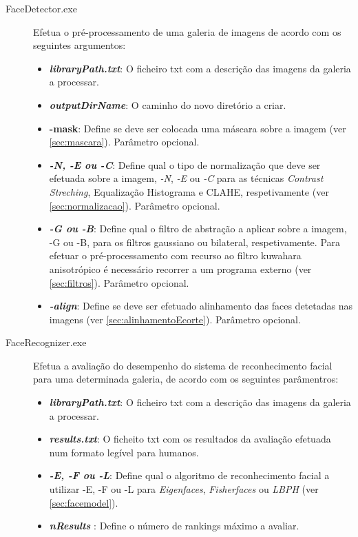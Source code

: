 \begin{description}
\item[FaceDetector.exe] Efetua o pré-processamento de uma galeria de imagens de acordo com os seguintes argumentos:

\begin{itemize}
\item \textbf{\textit{libraryPath.txt}}: O ficheiro txt com a descrição das imagens da galeria a processar.
\item \textbf{\textit{outputDirName}}: O caminho do novo diretório a criar.
\item \textbf{-mask}: Define se deve ser colocada uma máscara sobre a imagem (ver \ref{sec:mascara}). Parâmetro opcional.
\item \textbf{\textit{-N, -E ou -C}}: Define qual o tipo de normalização que deve ser efetuada sobre a imagem, \textit{-N}, \textit{-E} ou \textit{-C} para as técnicas \textit{Contrast Streching}, Equalização Histograma e CLAHE, respetivamente (ver \ref{sec:normalizacao}). Parâmetro opcional.
\item \textbf{\textit{-G ou -B}}: Define qual o filtro de abstração a aplicar sobre a imagem, -G ou -B, para os filtros gaussiano ou bilateral, respetivamente. Para efetuar o pré-processamento com recurso ao filtro kuwahara anisotrópico é necessário recorrer a um programa externo (ver \ref{sec:filtros}). Parâmetro opcional.
\item \textbf{\textit{-align}}: Define se deve ser efetuado alinhamento das faces detetadas nas imagens (ver \ref{sec:alinhamentoEcorte}). Parâmetro opcional.
\end{itemize}

\item[FaceRecognizer.exe] Efetua a avaliação do desempenho do sistema de reconhecimento facial para uma determinada galeria, de acordo com os seguintes parâmentros:

\begin{itemize}
\item \textbf{\textit{libraryPath.txt}}: O ficheiro txt com a descrição das imagens da galeria a processar.
\item \textbf{\textit{results.txt}}: O ficheito txt com os resultados da avaliação efetuada num formato legível para humanos.
\item \textbf{\textit{-E, -F ou -L}}: Define qual o algoritmo de reconhecimento facial a utilizar -E, -F ou -L para \textit{Eigenfaces}, \textit{Fisherfaces} ou \textit{LBPH} (ver \ref{sec:facemodel}).
\item \textbf{\textit{nResults }}: Define o número de rankings máximo a avaliar.
\end{itemize}


\end{description}
